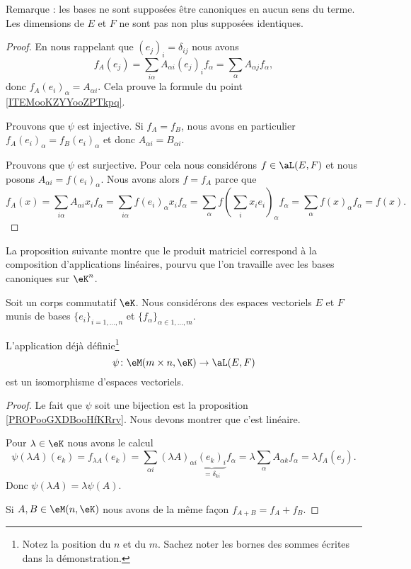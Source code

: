 Remarque : les bases ne sont supposées être canoniques en aucun sens du terme. Les dimensions de \( E\) et \( F\) ne sont pas non plus supposées identiques.

\begin{proof}
    En nous rappelant que \( (e_j)_i=\delta_{ij}\) nous avons
    \begin{equation}
        f_A(e_j)=\sum_{i\alpha}A_{\alpha i}(e_j)_if_{\alpha}=\sum_{\alpha}A_{\alpha j}f_{\alpha},
    \end{equation}
    donc \( f_A(e_i)_{\alpha}=A_{\alpha i}\). Cela prouve la formule du point \ref{ITEMooKZYYooZPTkpq}.

    Prouvons que \( \psi\) est injective. Si \( f_A=f_B\), nous avons en particulier \( f_A(e_i)_{\alpha}=f_B(e_i)_{\alpha}\) et donc \( A_{\alpha i}=B_{\alpha i}\).

    Prouvons que \( \psi\) est surjective. Pour cela nous considérons \( f\in \aL(E,F)\) et nous posons \( A_{\alpha i}=f(e_i)_{\alpha}\). Nous avons alors \( f=f_A\) parce que
    \begin{equation}
        f_A(x)=\sum_{i\alpha}A_{\alpha i}x_if_{\alpha}=\sum_{i\alpha}f(e_i)_{\alpha}x_if_{\alpha}=\sum_{\alpha}f(\sum_ix_ie_i)_{\alpha}f_{\alpha}=\sum_{\alpha}f(x)_{\alpha}f_{\alpha}=f(x).
    \end{equation}
\end{proof}

La proposition suivante montre que le produit matriciel correspond à la composition d'applications linéaires, pourvu que l'on travaille avec les bases canoniques sur \( \eK^n\).
\begin{proposition}      \label{PROPooIYVQooOiuRhX}
    Soit un corps commutatif \( \eK\). Nous considérons des espaces vectoriels \( E\) et \( F\) munis de bases \( \{ e_i \}_{i=1,\ldots, n}\) et \( \{ f_{\alpha}\}_{\alpha\in 1,\ldots, m} \).

    L'application déjà définie\footnote{Notez la position du \( n\) et du \( m\). Sachez noter les bornes des sommes écrites dans la démonstration.}
    \begin{equation}
        \psi\colon \eM(m\times n,\eK)\to \aL(E,F)
    \end{equation}
    est un isomorphisme d'espaces vectoriels.
\end{proposition}

\begin{proof}
    Le fait que \( \psi\) soit une bijection est la proposition \ref{PROPooGXDBooHfKRrv}. Nous devons montrer que c'est linéaire. 

    Pour \( \lambda\in \eK\) nous avons le calcul
    \begin{equation}
        \psi(\lambda A)(e_k)=f_{\lambda A}(e_k)=\sum_{\alpha i}(\lambda A)_{\alpha i}\underbrace{(e_k)_i}_{=\delta_{ki}}f_{\alpha}=\lambda\sum_{\alpha}A_{\alpha k}f_{\alpha}=\lambda f_A(e_j).
    \end{equation}
    Donc \( \psi(\lambda A)=\lambda\psi(A)\).

    Si \( A,B\in \eM(n,\eK)\) nous avons de la même façon \( f_{A+B}=f_A+f_B\).
\end{proof}

